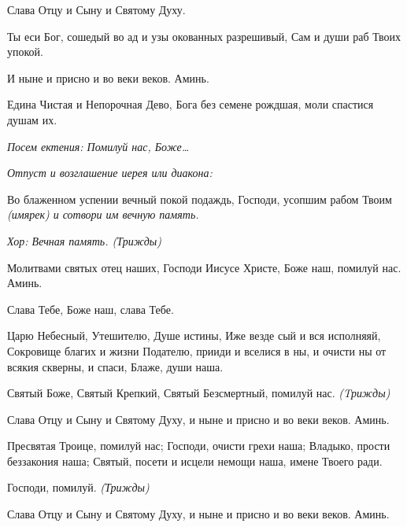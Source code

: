    Слава Отцу и Сыну и Святому Духу.


   Ты еси Бог, сошедый во ад и узы окованных разрешивый, Сам и души
раб Твоих упокой.


   И ныне и присно и во веки веков. Аминь.


   Едина Чистая и Непорочная Дево, Бога без семене рождшая, моли
спастися душам их.


 \itshape Посем ектения:\normalfont{} Помилуй нас, Боже…


 \itshape Отпуст и возглашение иерея или диакона:\normalfont{}


   Во блаженном успении вечный покой подаждь, Господи, усопшим рабом
Твоим \itshape (имярек)\normalfont{} и сотвори им вечную память.


 \itshape  Хор:\normalfont{} Вечная память. (\itshape  Трижды\normalfont{})

   

\mychapterending


 

Молитвами святых отец наших, Господи Иисусе Христе, Боже наш, помилуй
нас. Аминь.



   Слава Тебе, Боже наш, слава Тебе.



   Царю Небесный, Утешителю, Душе истины, Иже везде сый и вся
исполняяй, Сокровище благих и жизни Подателю, прииди и вселися в ны, и
очисти ны от всякия скверны, и спаси, Блаже, души наша.



   Святый Боже, Святый Крепкий, Святый Безсмертный, помилуй нас. \itshape 
(Tрижды)\normalfont{}



   Слава Отцу и Сыну и Святому Духу, и ныне и присно и во веки веков.
Аминь.



   Пресвятая Троице, помилуй нас; Господи, очисти грехи наша; Владыко,
прости беззакония наша; Святый, посети и исцели немощи наша, имене
Твоего ради.



   Господи, помилуй. \itshape  (Трижды)\normalfont{}



   Слава Отцу и Сыну и Святому Духу, и ныне и присно и во веки веков.
Аминь.



